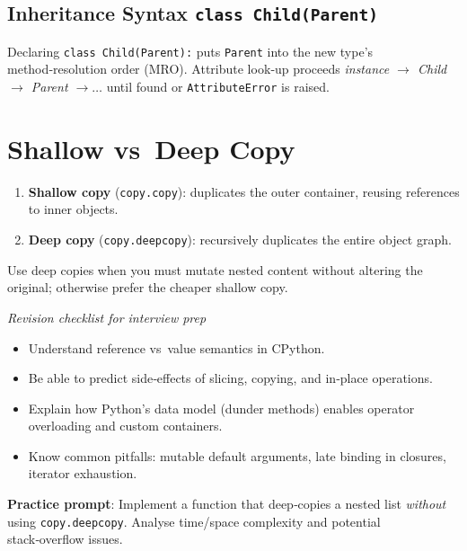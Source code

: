 \subsection{Inheritance Syntax \texttt{class Child(Parent)}}
Declaring \verb|class Child(Parent):| puts \verb|Parent| into the new type’s method‑resolution order (MRO).  Attribute look‑up proceeds \textit{instance \(\to\) Child \(\to\) Parent \(\to\dots\)} until found or \verb|AttributeError| is raised.

\section{Shallow vs\ Deep Copy}
\begin{enumerate}
  \item \textbf{Shallow copy} (\verb|copy.copy|): duplicates the outer container, reusing references to inner objects.
  \item \textbf{Deep copy} (\verb|copy.deepcopy|): recursively duplicates the entire object graph.
\end{enumerate}
Use deep copies when you must mutate nested content without altering the original; otherwise prefer the cheaper shallow copy.

\bigskip
\begin{center}\hrulefill\end{center}
\noindent\textit{Revision checklist for interview prep}
\begin{itemize}
  \item Understand reference vs\ value semantics in CPython.
  \item Be able to predict side‑effects of slicing, copying, and in‑place operations.
  \item Explain how Python’s data model (dunder methods) enables operator overloading and custom containers.
  \item Know common pitfalls: mutable default arguments, late binding in closures, iterator exhaustion.
\end{itemize}

\bigskip
\noindent\textbf{Practice prompt}: Implement a function that deep‑copies a nested list \emph{without} using \verb|copy.deepcopy|.  Analyse time/space complexity and potential stack‑overflow issues.
